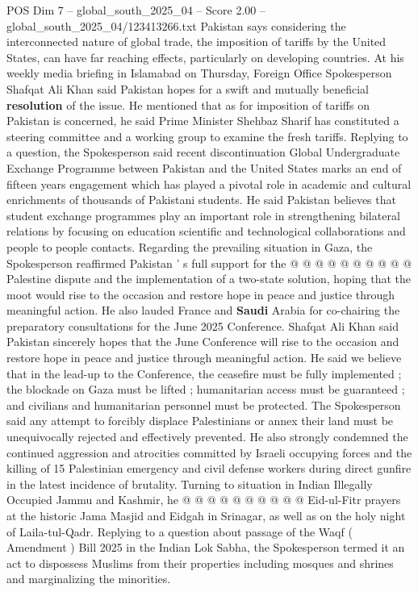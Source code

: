 \begin{textsample}{POS Dim 7 – global\_south\_2025\_04 – Score 2.00 – global\_south\_2025\_04/123413266.txt}  \label{ex:f7_pos_143}
Pakistan says considering the interconnected nature of global trade, the imposition of tariffs by the United States, can have far reaching effects, particularly on developing countries.
At his weekly media briefing in Islamabad on Thursday, Foreign Office Spokesperson Shafqat Ali Khan said Pakistan hopes for a swift and mutually beneficial \textbf{resolution} of the issue.
He mentioned that as for imposition of tariffs on Pakistan is concerned, he said Prime Minister Shehbaz Sharif has constituted a steering committee and a working group to examine the fresh tariffs.
Replying to a question, the Spokesperson said recent discontinuation Global Undergraduate Exchange Programme between Pakistan and the United States marks an end of fifteen years engagement which has played a pivotal role in academic and cultural enrichments of thousands of Pakistani students.
He said Pakistan believes that student exchange programmes play an important role in strengthening bilateral relations by focusing on education scientific and technological collaborations and people to people contacts.
Regarding the prevailing situation in Gaza, the Spokesperson reaffirmed Pakistan ' s full support for the @ @ @ @ @ @ @ @ @ @ Palestine dispute and the implementation of a two-state solution, hoping that the moot would rise to the occasion and restore hope in peace and justice through meaningful action.
He also lauded France and \textbf{Saudi} Arabia for co-chairing the preparatory consultations for the June 2025 Conference.
Shafqat Ali Khan said Pakistan sincerely hopes that the June Conference will rise to the occasion and restore hope in peace and justice through meaningful action.
He said we believe that in the lead-up to the Conference, the ceasefire must be fully implemented ; the blockade on Gaza must be lifted ; humanitarian access must be guaranteed ; and civilians and humanitarian personnel must be protected.
The Spokesperson said any attempt to forcibly displace Palestinians or annex their land must be unequivocally rejected and effectively prevented.
He also strongly condemned the continued aggression and atrocities committed by Israeli occupying forces and the killing of 15 Palestinian emergency and civil defense workers during direct gunfire in the latest incidence of brutality.
Turning to situation in Indian Illegally Occupied Jammu and Kashmir, he @ @ @ @ @ @ @ @ @ @ Eid-ul-Fitr prayers at the historic Jama Masjid and Eidgah in Srinagar, as well as on the holy night of Laila-tul-Qadr.
Replying to a question about passage of the Waqf ( Amendment ) Bill 2025 in the Indian Lok Sabha, the Spokesperson termed it an act to dispossess Muslims from their properties including mosques and shrines and marginalizing the minorities.

\end{textsample}
